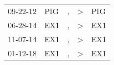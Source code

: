 \begin{supertabular}{p{0.07\textwidth}p{0.06\textwidth}p{0.02\textwidth}p{0.02\textwidth}p{0.06\textwidth}}
          09-22-12\textsuperscript{} &           PIG\textsuperscript{} &             , &     \textgreater &   PIG\textsuperscript{} \\
          06-28-14\textsuperscript{} &           EX1\textsuperscript{} &             , &     \textgreater &   EX1\textsuperscript{} \\
          11-07-14\textsuperscript{} &           EX1\textsuperscript{} &             , &     \textgreater &   EX1\textsuperscript{} \\
          01-12-18\textsuperscript{} &           EX1\textsuperscript{} &             , &     \textgreater &   EX1\textsuperscript{} \\
\end{supertabular}
